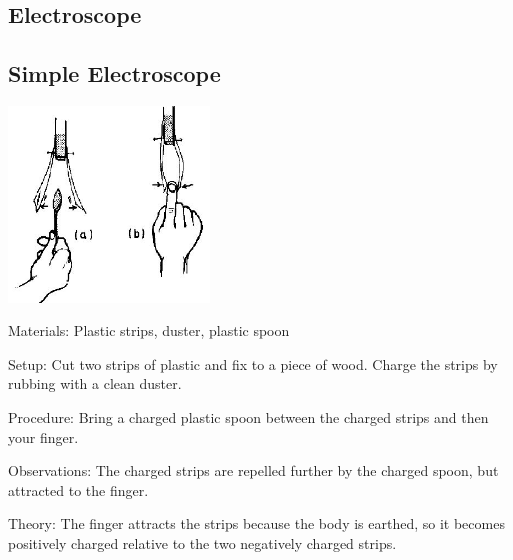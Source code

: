 \begin{multicols}{2}

\section*{Electroscope} 


\subsection{Simple Electroscope}

\begin{center}
\includegraphics[width=0.4\textwidth]{./img/source/simple-electroscope.jpg}
\end{center}

\begin{description*}
\item[Materials:]{Plastic strips, duster, plastic spoon}
\item[Setup:]{Cut two strips of plastic and fix to a piece of wood. Charge the strips by rubbing with a clean duster.}
\item[Procedure:]{Bring a charged plastic spoon between the charged strips and then your finger.}
\item[Observations:]{The charged strips are repelled further by the charged spoon, but attracted to the finger.}
\item[Theory:]{The finger attracts the strips because the body is earthed, so it becomes positively
charged relative to the two negatively charged strips.}
\end{description*}

\columnbreak


\end{multicols}
